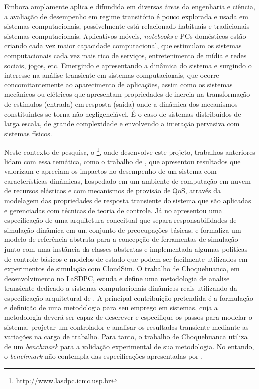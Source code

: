 Embora amplamente aplica e difundida em diversas áreas da engenharia e ciência, a avaliação de desempenho em regime transitório é pouco explorada e usada em sistemas computacionais, possivelmente está relacionado habituais e tradicionais sistemas computacionais. Aplicativos móveis, \textit{notebooks} e PCs domésticos estão criando cada vez maior capacidade computacional, que estimulam os sistemas computacionais cada vez mais rico de serviços, entretenimento de mídia e redes sociais, jogos, etc. Emergindo e apresentando a dinâmica do sistema e surgindo o interesse na análise transiente em sistemas computacionais, que ocorre concomitantemente ao aparecimento de aplicações, assim como os sistemas mecânicos ou elétricos que apresentam propriedades de inercia na transformação de estímulos (entrada) em resposta (saída) onde a dinâmica dos mecanismos constituintes se torna não negligenciável. É o caso de sistemas distribuídos de larga escala, de grande complexidade e envolvendo a interação pervasiva com sistemas físicos. \cite{Egami2011, Kannan2011} 

Neste contexto de pesquisa, o \textit{}\footnote{\url{http://www.lasdpc.icmc.usp.br}}, onde desenvolve este projeto, trabalhos anteriores lidam com essa temática, como o trabalho de \cite{Nobile2013}, que apresentou resultados que valorizam e apreciam os impactos no desempenho de um sistema com características dinâmicas, hospedado em um ambiente de computação em nuvem de recursos elásticos e com mecanismos de provisão de QoS, através da modelagem das propriedades de resposta transiente do sistema que são aplicadas e gerenciadas com  técnicas de teoria de controle. Já no \cite{Lourenco2015} apresentou uma especificação de uma arquitetura conceitual que separa responsabilidades de simulação dinâmica em um conjunto de preocupações básicas, e formaliza um modelo de referência abstrata para a concepção de ferramentas de simulação junto com uma instância da classes abstratas e implementada algumas políticas de controle básicos e modelos de estado que podem ser facilmente utilizados em experimentos de simulação com CloudSim. O trabalho de Choquehuanca, em desenvolvimento no LaSDPC, estuda e define uma metodologia de analise transiente dedicado a sistemas computacionais dinâmicos reais utilizando da especificação arquitetural de \cite{Lourenco2015}. A principal contribuição pretendida é a formulação e definição de uma metodologia para seu emprego em sistemas, cuja a metodologia deverá ser capaz de descrever e especifique os passos para modelar o sistema, projetar um controlador e analisar os resultados transiente mediante as variações na carga de trabalho. Para tanto, o trabalho de Choquehuanca utiliza de um \textit{benchmark} para a validação experimental de sua metodologia. No entando, o \textit{benchmark} não contempla das especificações apresentadas por \cite{Lourenco2015}.

